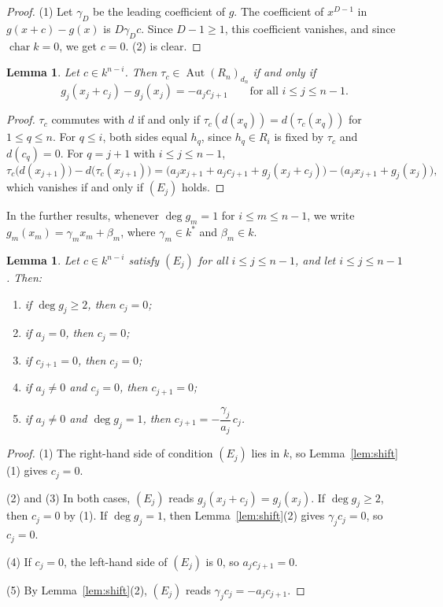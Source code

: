 \documentclass[11pt]{amsart}
\newtheorem{lemma}[theorem]{Lemma}
\theoremstyle{definition}
\theoremstyle{remark}
\numberwithin{equation}{theorem}
\newcommand{\Aut}{\operatorname{Aut}}
\begin{document}
\begin{proof}
(1) Let $\gamma_D$ be the leading coefficient of $g$. The coefficient of $x^{D-1}$ in $g(x+c)-g(x)$
is $D\gamma_Dc$. Since $D-1\ge1$, this coefficient vanishes, and since $\operatorname{char}k=0$, we
get $c=0$. (2) is clear.
\end{proof}

\begin{lemma}\label{lem:constraints}
Let $c\in k^{n-i}$. Then $\tau_c\in\Aut(R_n)_{d_n}$ if and only if
\begin{equation*}
g_j(x_j+c_j)-g_j(x_j)=-a_jc_{j+1}\qquad\text{for all } i\le j\le n-1. \tag{$E_j$}
\end{equation*}
\end{lemma}

\begin{proof}
$\tau_c$ commutes with $d$ if and only if $\tau_c(d(x_q))=d(\tau_c(x_q))$ for $1\le q\le n$. For
$q\le i$, both sides equal $h_q$, since $h_q\in R_i$ is fixed by $\tau_c$ and $d(c_q)=0$. For
$q=j+1$ with $i\le j\le n-1$,
\[
\tau_c\bigl(d(x_{j+1})\bigr)-d\bigl(\tau_c(x_{j+1})\bigr)
=\bigl(a_jx_{j+1}+a_jc_{j+1}+g_j(x_j+c_j)\bigr)-\bigl(a_jx_{j+1}+g_j(x_j)\bigr),
\]
which vanishes if and only if $(E_j)$ holds.
\end{proof}
In the further results, whenever $\deg g_m=1$ for $i\le m\le n-1$, we write
$g_m(x_m)=\gamma_mx_m+\beta_m$, where $\gamma_m\in k^*$ and $\beta_m\in k$.
\begin{lemma}\label{lem:rules}
Let $c\in k^{n-i}$ satisfy $(E_j)$ for all $i\le j\le n-1$, and let $i\le j\le n-1$. Then:
\begin{enumerate}[label=\textup{(\arabic*)}]
\item if $\deg g_j\ge2$, then $c_j=0$;
\item if $a_j=0$, then $c_j=0$;
\item if $c_{j+1}=0$, then $c_j=0$;
\item if $a_j\neq0$ and $c_j=0$, then $c_{j+1}=0$;
\item if $a_j\neq0$ and $\deg g_j=1$, then $c_{j+1}=-\dfrac{\gamma_j}{a_j}\,c_j$.
\end{enumerate}
\end{lemma}

\begin{proof}
(1) The right-hand side of condition $(E_j)$ lies in $k$, so Lemma~\ref{lem:shift}(1) gives $c_j=0$.

(2) and (3) In both cases, $(E_j)$ reads $g_j(x_j+c_j)=g_j(x_j)$. If $\deg g_j\ge2$, then $c_j=0$ by
(1). If $\deg g_j=1$, then Lemma~\ref{lem:shift}(2) gives $\gamma_jc_j=0$, so $c_j=0$.

(4) If $c_j=0$, the left-hand side of $(E_j)$ is $0$, so $a_jc_{j+1}=0$.

(5) By Lemma~\ref{lem:shift}(2), $(E_j)$ reads $\gamma_jc_j=-a_jc_{j+1}$.
\end{proof}
\end{document}
